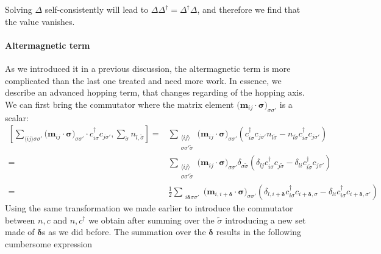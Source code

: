 \documentclass[../main.tex]{subfile}
\begin{document}
Solving $\Delta$ self-consistently will lead to $\Delta\Delta^{\dagger} = \Delta^{\dagger}\Delta$, and therefore we find that the value vanishes.

\paragraph{Altermagnetic term}
As we introduced it in a previous discussion, the altermagnetic term is more complicated than the last one treated and need more work. In essence, we describe an 
advanced hopping term, that changes regarding of the hopping axis.
We can first bring the commutator where the matrix element $\bigl(\bm{m}_{ij}\cdot\bm{\sigma}\bigr)_{\sigma\sigma'} $ is a scalar:
\begin{equation*}
    \begin{aligned}
    \left[\sum_{\langle i j \rangle\sigma\sigma'}\bigl(\bm{m}_{ij}\cdot\bm{\sigma}\bigr)_{\sigma\sigma'} 
         \cdot c_{i\sigma}^{\dagger}c_{j\sigma'}, \sum_{\tilde{\sigma}} n_{l,\tilde{\sigma}}\right] 
        =&\sum_{\substack{\langle i j \rangle \\\sigma\sigma'\tilde{\sigma}}} 
         \bigl(\bm{m}_{ij}\cdot\bm{\sigma}\bigr)_{\sigma\sigma'}  \left(c_{i\sigma}^{\dagger}c_{j\sigma'}n_{l\tilde{\sigma}} 
        -n_{l\tilde{\sigma}}c_{i\sigma}^{\dagger}c_{j\sigma'} \right)\\
        = &\sum_{\substack{\langle i j \rangle \\\sigma\sigma'\tilde{\sigma}}}  \bigl(\bm{m}_{ij}\cdot\bm{\sigma}\bigr)_{\sigma\sigma'}  
         \delta_{\sigma\tilde{\sigma}} \left(\delta_{lj}c_{i\sigma}^{\dagger}c_{j\tilde{\sigma}} - \delta_{li}c_{i\tilde{\sigma}}^{\dagger}c_{j\sigma'}\right)\\
        = &\frac{1}{2}\sum_{\substack{ i \bm{\delta}\sigma\sigma'}}  \bigl(\bm{m}_{i,i+\bm{\delta}}\cdot\bm{\sigma}\bigr)_{\sigma\sigma'}  
         \left(\delta_{l,i+\bm{\delta}}c_{i\sigma}^{\dagger}c_{i+\bm{\delta},\sigma} - \delta_{li}c_{i\sigma}^{\dagger}c_{i+\bm{\delta},\sigma'}\right)
    \end{aligned}
\end{equation*}
Using the same transformation we made earlier to introduce the commutator between $n,c$ and $n,c^{\dagger}$ we obtain after summing over the $\tilde{\sigma}$
introducing a new set made of  $\bm{\delta}$s as we did before. The summation over the $\bm{\delta}$ results in the following cumbersome expression
\end{document}
